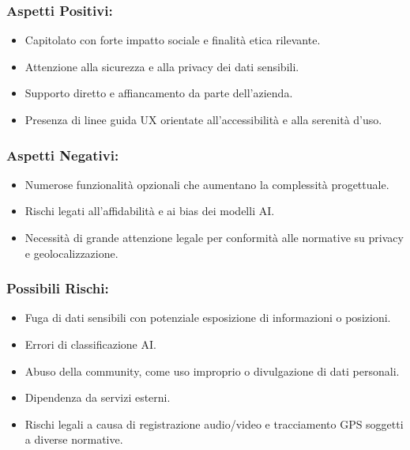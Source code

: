 \documentclass[a4paper,12pt]{article}
\begin{document}
\subsubsection*{Aspetti Positivi:}
\begin{itemize}[leftmargin=*]
    \item Capitolato con forte impatto sociale e finalità etica rilevante.
    \item Attenzione alla sicurezza e alla privacy dei dati sensibili.
    \item Supporto diretto e affiancamento da parte dell'azienda.
    \item Presenza di linee guida UX orientate all'accessibilità e alla serenità d'uso.
\end{itemize}

\subsubsection*{Aspetti Negativi:}
\begin{itemize}[leftmargin=*]
    \item Numerose funzionalità opzionali che aumentano la complessità progettuale.
    \item Rischi legati all'affidabilità e ai bias dei modelli AI.
    \item Necessità di grande attenzione legale per conformità alle normative su privacy
          e geolocalizzazione.
\end{itemize}

\subsubsection*{Possibili Rischi:}
\begin{itemize}[leftmargin=*]
    \item Fuga di dati sensibili con potenziale esposizione di informazioni o posizioni.
    \item Errori di classificazione AI.
    \item Abuso della community, come uso improprio o divulgazione di dati personali.
    \item Dipendenza da servizi esterni.
    \item Rischi legali a causa di registrazione audio/video e tracciamento GPS soggetti
          a diverse normative.
\end{itemize}
\end{document}
